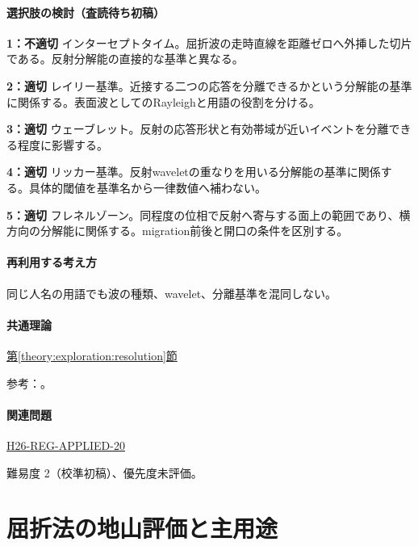 \paragraph{選択肢の検討（査読待ち初稿）}\mbox{}\par

\noindent\textbf{1：不適切} インターセプトタイム。屈折波の走時直線を距離ゼロへ外挿した切片である。反射分解能の直接的な基準と異なる。\par

\noindent\textbf{2：適切} レイリー基準。近接する二つの応答を分離できるかという分解能の基準に関係する。表面波としてのRayleighと用語の役割を分ける。\par

\noindent\textbf{3：適切} ウェーブレット。反射の応答形状と有効帯域が近いイベントを分離できる程度に影響する。\par

\noindent\textbf{4：適切} リッカー基準。反射waveletの重なりを用いる分解能の基準に関係する。具体的閾値を基準名から一律数値へ補わない。\par

\noindent\textbf{5：適切} フレネルゾーン。同程度の位相で反射へ寄与する面上の範囲であり、横方向の分解能に関係する。migration前後と開口の条件を区別する。\par

\paragraph{再利用する考え方} 同じ人名の用語でも波の種類、wavelet、分離基準を混同しない。

\paragraph{共通理論} \hyperref[theory:exploration:resolution]{第\ref*{theory:exploration:resolution}節}

\par 参考：\cite{seg_vertical_resolution,seg_lateral_resolution,usgs_refraction2013}。

\paragraph{関連問題} \hyperref[q:h26-reg-applied-20]{H26-REG-APPLIED-20}

\par 難易度 2（校準初稿）、優先度未評価。

\section{屈折法の地山評価と主用途}

